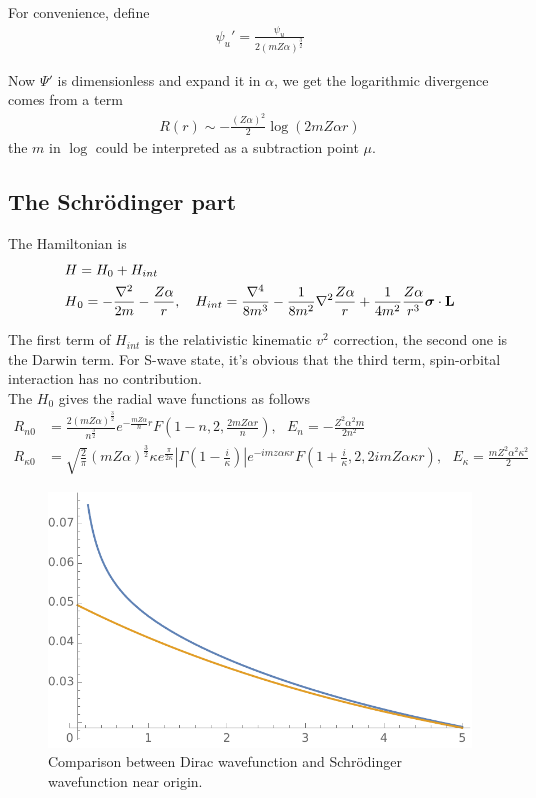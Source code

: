 \documentclass{article}
\renewcommand{\a}{\alpha}
\newcommand{\s}{\sigma}
\begin{document}
For convenience, define
\begin{align}
	\psi_u '=\frac{\psi_u}{2(mZ\alpha)^\frac{3}{2}}
\end{align}

Now $\Psi '$ is dimensionless and expand it in $\alpha$, we get the logarithmic divergence comes from a term
\begin{align}
	R(r)\sim-\frac{(Z\alpha)^2}{2}\log(2m Z\a r)
\end{align}
the $m$ in $\log$ could be interpreted as a subtraction point $\mu$.

\subsection{The Schr\"odinger part}

The Hamiltonian is
\begin{align}
	H & =H_0+H_{int}                                                                                                                                                      \\
	H & _0=-\frac{\nabla^2}{2m}-\frac{Z\alpha}{r},\ \ \ H_{int}=\frac{\nabla^4}{8m^3}-\frac{1}{8m^2}\nabla^2\frac{Z\a}{r}+\frac{1}{4m^2}\frac{Z\a}{r^3}\bm{\s}\cdot\vb{L}
\end{align}

The first term of $H_{int}$ is the relativistic kinematic $v^2$ correction, the second one is the Darwin term. For S-wave state, it's obvious that the third term, spin-orbital interaction has no contribution. \\
The $H_0$ gives the radial wave functions as follows
\begin{align}
	R_{n0}      & =\frac{2(mZ\alpha)^\frac{3}{2}}{n^\frac{3}{2}}e^{-\frac{mZ\alpha}{n}r}F(1-n,2,\frac{2mZ\alpha r}{n}),\ \ \ E_n=-\frac{Z^2\alpha^2m}{2n^2}                                                                           \\
	R_{\kappa0} & =\sqrt{\frac{2}{\pi}}(mZ\alpha)^\frac{3}{2}\kappa e^\frac{\pi}{2\kappa}|\Gamma(1-\frac{i}{\kappa})|e^{-imz\alpha \kappa r}F(1+\frac{i}{\kappa},2,2imZ\alpha \kappa r),\ \ \ E_\kappa=\frac{mZ^2\alpha^2\kappa^2}{2}
\end{align}
\begin{figure}[!tbhp]
	\centering
	\includegraphics[width=4 in]{QM-Dirac-1.pdf}
	\caption{Comparison between Dirac wavefunction and Schr\"odinger wavefunction near origin. }
\end{figure}
\end{document}
